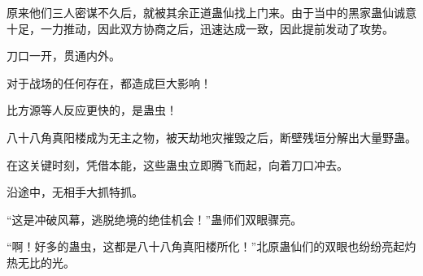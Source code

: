 \begin{this_body}
原来他们三人密谋不久后，就被其余正道蛊仙找上门来。由于当中的黑家蛊仙诚意十足，一力推动，因此双方协商之后，迅速达成一致，因此提前发动了攻势。

刀口一开，贯通内外。

对于战场的任何存在，都造成巨大影响！

比方源等人反应更快的，是蛊虫！

八十八角真阳楼成为无主之物，被天劫地灾摧毁之后，断壁残垣分解出大量野蛊。

在这关键时刻，凭借本能，这些蛊虫立即腾飞而起，向着刀口冲去。

沿途中，无相手大抓特抓。

“这是冲破风幕，逃脱绝境的绝佳机会！”蛊师们双眼骤亮。

“啊！好多的蛊虫，这都是八十八角真阳楼所化！”北原蛊仙们的双眼也纷纷亮起灼热无比的光。

\end{this_body}

